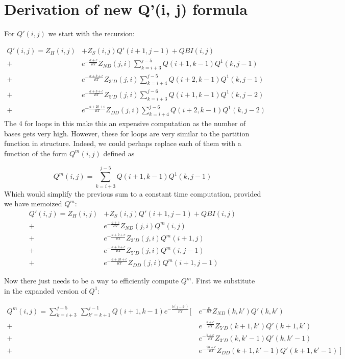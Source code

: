\section{Derivation of new Q'(i, j) formula}
For $Q'(i, j)$ we start with the recursion:

\begin{equation}
\begin{split}
Q'(i,j) = Z_H(i, j) &+ Z_S(i, j) Q'(i+1, j-1) + QBI(i, j) \\
+\ & e^{-\frac{a+c}{RT}}Z_{ND}(j, i) \sum_{k = i + 3}^{j-5}Q(i+1, k - 1)Q^1(k, j-1)  \\
+\ & e^{-\frac{a+b+c}{RT}}Z_{3'D}(j, i) \sum_{k = i + 4}^{j-5}Q(i+2, k - 1)Q^1(k, j-1)  \\
+\ & e^{-\frac{a+b+c}{RT}}Z_{5'D}(j, i) \sum_{k = i + 3}^{j-6}Q(i+1, k - 1)Q^1(k, j-2) \\
+\ & e^{-\frac{a+2b+c}{RT}}Z_{DD}(j, i) \sum_{k = i + 4}^{j-6}Q(i+2, k - 1)Q^1(k, j-2) 
\end{split}
\end{equation}
\noindent
The 4 for loops in this make this an expensive computation as the number of bases gets very high. However, these for loops are very similar to the partition function in structure. Indeed, we could perhaps replace each of them with a function of the form $Q^m(i, j)$ defined as

\begin{equation}
Q^m(i, j) = \sum_{k = i +3}^{j-5} Q(i + 1, k - 1) Q^1(k, j - 1)
\end{equation} 
\noindent
Which would simplify the previous sum to a constant time computation, provided we have memoized $Q^m$:
\begin{equation}
\begin{split}
Q'(i,j) = Z_H(i, j) &+ Z_S(i, j) Q'(i+1, j-1) + QBI(i, j)  \\
+\ & e^{-\frac{a+c}{RT}}Z_{ND}(j, i) Q^m(i, j)  \\
+\ & e^{-\frac{a+b+c}{RT}}Z_{3'D}(j, i) Q^m( i + 1, j) \\
+\ & e^{-\frac{a+b+c}{RT}}Z_{5'D}(j, i) Q^m(i, j- 1) \\
+\ & e^{-\frac{a+2b+c}{RT}}Z_{DD}(j, i) Q^m(i + 1, j -1)
\end{split}
\end{equation}

\noindent
Now there just needs to be a way to efficiently compute $Q^m$. First we substitute in the expanded version of $Q^1$:

\begin{equation}
\begin{split}
Q^m(i, j) = \sum_{k = i + 3}^{j - 5}\  \sum_{k' = k + 1}^{j- 1} Q(i + 1, k - 1)  e^{-\frac{b(j - k')}{RT} } \bigg [ \ 
  & e^{-\frac{c}{RT} }Z_{ND}(k, k') Q'(k, k') \\
+\  & e^{-\frac{b + c}{RT}}Z_{5'D}(k + 1, k')Q'(k + 1, k') \\ 
 +\ & e^{-\frac{b + c}{RT}}Z_{3'D}(k, k'-1)Q'(k, k' - 1) \\
+\  & e^{-\frac{2b + c}{RT}}Z_{DD}(k + 1, k'-1)Q'(k + 1, k'-1) \   \bigg ]
\end{split}
\end{equation}


